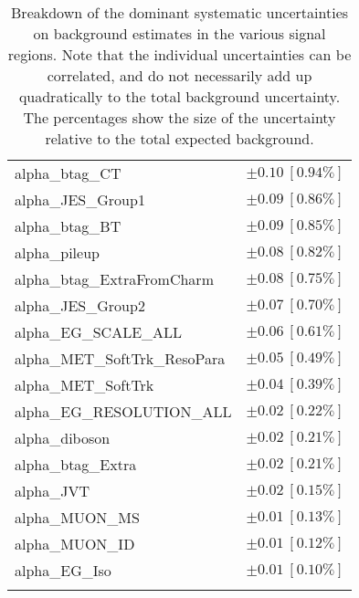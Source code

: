 \begin{table}
\begin{center}
\begin{tabular*}{\textwidth}{@{\extracolsep{\fill}}lc}
alpha\_btag\_CT         & $\pm 0.10\ [0.94\%] $       \\
alpha\_JES\_Group1         & $\pm 0.09\ [0.86\%] $       \\
alpha\_btag\_BT         & $\pm 0.09\ [0.85\%] $       \\
alpha\_pileup         & $\pm 0.08\ [0.82\%] $       \\
alpha\_btag\_ExtraFromCharm         & $\pm 0.08\ [0.75\%] $       \\
alpha\_JES\_Group2         & $\pm 0.07\ [0.70\%] $       \\
alpha\_EG\_SCALE\_ALL         & $\pm 0.06\ [0.61\%] $       \\
alpha\_MET\_SoftTrk\_ResoPara         & $\pm 0.05\ [0.49\%] $       \\
alpha\_MET\_SoftTrk         & $\pm 0.04\ [0.39\%] $       \\
alpha\_EG\_RESOLUTION\_ALL         & $\pm 0.02\ [0.22\%] $       \\
alpha\_diboson         & $\pm 0.02\ [0.21\%] $       \\
alpha\_btag\_Extra         & $\pm 0.02\ [0.21\%] $       \\
alpha\_JVT         & $\pm 0.02\ [0.15\%] $       \\
alpha\_MUON\_MS         & $\pm 0.01\ [0.13\%] $       \\
alpha\_MUON\_ID         & $\pm 0.01\ [0.12\%] $       \\
alpha\_EG\_Iso         & $\pm 0.01\ [0.10\%] $       \\
\noalign{\smallskip}\hline\noalign{\smallskip}
\end{tabular*}
\end{center}
\caption[Breakdown of uncertainty on background estimates]{
Breakdown of the dominant systematic uncertainties on background estimates in the various signal regions.
Note that the individual uncertainties can be correlated, and do not necessarily add up quadratically to 
the total background uncertainty. The percentages show the size of the uncertainty relative to the total expected background.
\label{table.results.bkgestimate.uncertainties.VRtt3offEM_cuts}}
\end{table}
%